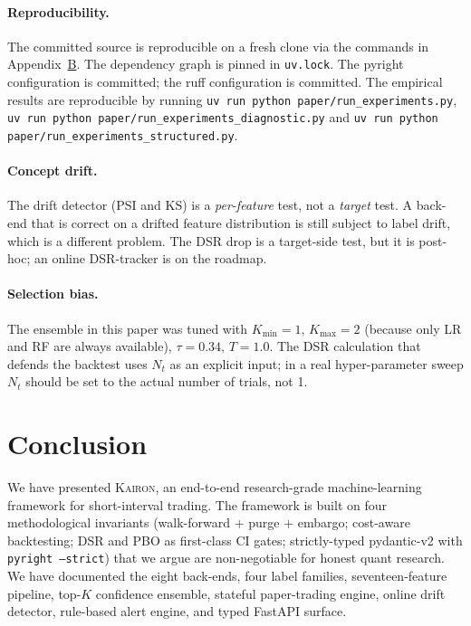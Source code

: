 \documentclass[11pt,a4paper]{article}
\let\oldsection\section
\renewcommand{\section}{\clearpage\oldsection}
\providecommand{\kairon}{\textsc{Kairon}}
\providecommand{\dsr}{\textsc{DSR}}
\providecommand{\pbo}{\textsc{PBO}}
\providecommand{\PSIsym}{\textsc{PSI}}
\providecommand{\KSsym}{\textsc{KS}}
\begin{document}
\paragraph{Reproducibility.}
The committed source is reproducible on a fresh clone
via the commands in Appendix~\hyperref[app:repro]{B}.
The dependency graph is pinned in \texttt{uv.lock}.
The pyright configuration is committed; the ruff
configuration is committed. The empirical results are
reproducible by running
\texttt{uv run python paper/run\_experiments.py},
\texttt{uv run python paper/run\_experiments\_diagnostic.py}
and \texttt{uv run python paper/run\_experiments\_structured.py}.

\paragraph{Concept drift.}
The drift detector (\PSIsym{} and \KSsym{}) is a
\emph{per-feature} test, not a \emph{target} test. A
back-end that is correct on a drifted feature
distribution is still subject to label drift, which
is a different problem. The DSR drop is a target-side
test, but it is post-hoc; an online DSR-tracker is on
the roadmap.

\paragraph{Selection bias.}
The ensemble in this paper was tuned with
$K_{\min}=1,\,K_{\max}=2$ (because only LR and RF
are always available), $\tau=0.34,\,T=1.0$. The
DSR calculation that defends the backtest uses
$N_t$ as an explicit input; in a real
hyper-parameter sweep $N_t$ should be set to the
actual number of trials, not 1.

\section{Conclusion}\label{sec:concl}

We have presented \kairon{}, an end-to-end research-grade
machine-learning framework for short-interval trading. The
framework is built on four methodological invariants
(walk-forward + purge + embargo; cost-aware backtesting;
\dsr{} and \pbo{} as first-class CI gates; strictly-typed
pydantic-v2 with \texttt{pyright --strict}) that we argue
are non-negotiable for honest quant research. We have
documented the eight back-ends, four label families,
seventeen-feature pipeline, top-$K$ confidence ensemble,
stateful paper-trading engine, online drift detector,
rule-based alert engine, and typed FastAPI surface.
\end{document}
